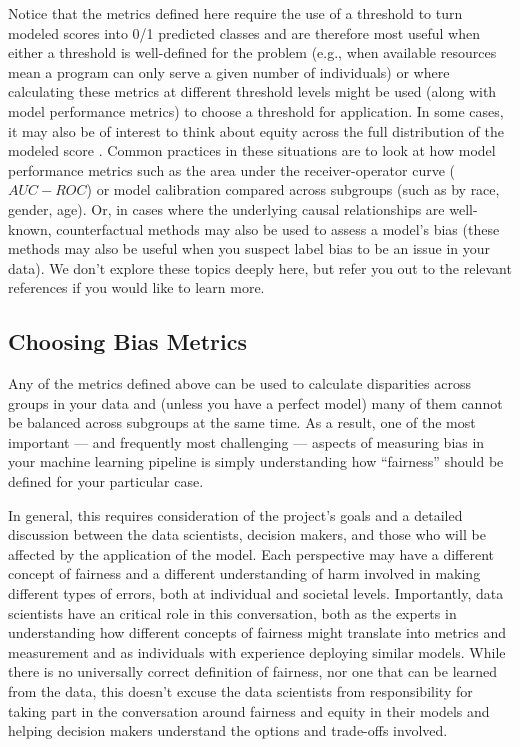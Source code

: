\documentclass[]{krantz}
\begin{document}
Notice that the metrics defined here require the use of a threshold to
turn modeled scores into 0/1 predicted classes and are therefore most
useful when either a threshold is well-defined for the problem (e.g.,
when available resources mean a program can only serve a given number of
individuals) or where calculating these metrics at different threshold
levels might be used (along with model performance metrics) to choose a
threshold for application. In some cases, it may also be of interest to
think about equity across the full distribution of the modeled score
\citep{chouldechova2017, kleinberg2017}. Common practices in these
situations are to look at how model performance metrics such as the area
under the receiver-operator curve (\(AUC-ROC\)) or model calibration
compared across subgroups (such as by race, gender, age). Or, in cases
where the underlying causal relationships are well-known, counterfactual
methods \citep{kilbertus2017, kusner2017} may also be used to assess a
model's bias (these methods may also be useful when you suspect label
bias to be an issue in your data). We don't explore these topics deeply
here, but refer you out to the relevant references if you would like to
learn more.

\subsection{Choosing Bias Metrics}\label{choosing-bias-metrics}

Any of the metrics defined above can be used to calculate disparities
across groups in your data and (unless you have a perfect model) many of
them cannot be balanced across subgroups at the same time. As a result,
one of the most important --- and frequently most challenging ---
aspects of measuring bias in your machine learning pipeline is simply
understanding how ``fairness'' should be defined for your particular
case.

In general, this requires consideration of the project's goals and a
detailed discussion between the data scientists, decision makers, and
those who will be affected by the application of the model. Each
perspective may have a different concept of fairness and a different
understanding of harm involved in making different types of errors, both
at individual and societal levels. Importantly, data scientists have an
critical role in this conversation, both as the experts in understanding
how different concepts of fairness might translate into metrics and
measurement and as individuals with experience deploying similar models.
While there is no universally correct definition of fairness, nor one
that can be learned from the data, this doesn't excuse the data
scientists from responsibility for taking part in the conversation
around fairness and equity in their models and helping decision makers
understand the options and trade-offs involved.
\end{document}
